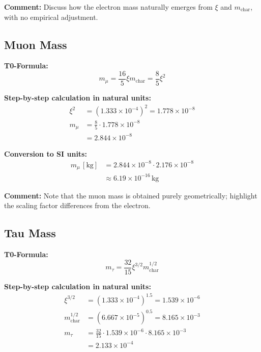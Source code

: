 \documentclass[12pt,a4paper]{article}
\newcommand{\xipar}{\xi}            %
\newcommand{\mchar}{m_{\text{char}}} %
\begin{document}
\textbf{Comment:} Discuss how the electron mass naturally emerges from $\xipar$ and $\mchar$, with no empirical adjustment.

\subsection{Muon Mass}

\textbf{T0-Formula:}
\begin{equation}
	m_\mu = \frac{16}{5} \xipar \mchar = \frac{8}{5} \xipar^2
\end{equation}

\textbf{Step-by-step calculation in natural units:}
\begin{align}
	\xipar^2 &= (1.333 \times 10^{-4})^2 = 1.778 \times 10^{-8} \\
	m_\mu &= \frac{8}{5} \cdot 1.778 \times 10^{-8} \\
	&= 2.844 \times 10^{-8}
\end{align}

\textbf{Conversion to SI units:}
\begin{align}
	m_\mu \,[\text{kg}] &= 2.844 \times 10^{-8} \cdot 2.176 \times 10^{-8} \\
	&\approx 6.19 \times 10^{-16}\,\text{kg}
\end{align}

\textbf{Comment:} Note that the muon mass is obtained purely geometrically; highlight the scaling factor differences from the electron.

\subsection{Tau Mass}

\textbf{T0-Formula:}
\begin{equation}
	m_\tau = \frac{32}{15} \xipar^{3/2} \mchar^{1/2}
\end{equation}

\textbf{Step-by-step calculation in natural units:}
\begin{align}
	\xipar^{3/2} &= (1.333 \times 10^{-4})^{1.5} = 1.539 \times 10^{-6} \\
	\mchar^{1/2} &= (6.667 \times 10^{-5})^{0.5} = 8.165 \times 10^{-3} \\
	m_\tau &= \frac{32}{15} \cdot 1.539 \times 10^{-6} \cdot 8.165 \times 10^{-3} \\
	&= 2.133 \times 10^{-4}
\end{align}
\end{document}
